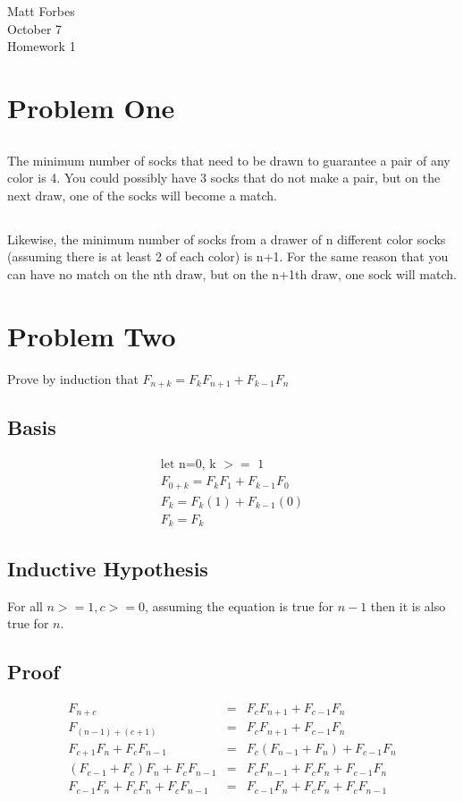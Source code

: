 \documentclass[a4paper,12pt]{article}
\begin{document}
\noindent Matt Forbes \\
October 7 \\
Homework 1 \\


\section{Problem One}
\subsection{}
The minimum number of socks that need to be drawn to guarantee a pair
of any color is 4.  You could possibly have 3 socks that do not make a
pair, but on the next draw, one of the socks will become a match.
\subsection{}
Likewise, the minimum number of socks from a drawer of n different
color socks (assuming there is at least 2 of each color) is n+1. For
the same reason that you can have no match on the nth draw, but on the
n+1th draw, one sock will match.

\section{Problem Two}
Prove by induction that \(F_{n+k} = F_kF_{n+1} + F_{k-1}F_n\)
\subsection{Basis}
\begin{align*}
  \text{let n=0, k \(>=\) 1} \\
  F_{0+k} = F_kF_1 + F_{k-1}F_0 \\
  F_k = F_k(1) + F_{k-1}(0) \\
  F_k = F_k
\end{align*}

\subsection{Inductive Hypothesis}
For all \(n >= 1, c >= 0 \), assuming the equation is true for \(n-1\) then it 
is also true for \(n\).

\subsection{Proof}
\begin{eqnarray*}
  F_{n+c} &=& F_cF_{n+1} + F_{c-1}F_n \\
  F_{(n-1) + (c+1)} &=& F_cF_{n+1} + F_{c-1}F_n \\
  F_{c+1}F_n + F_cF_{n-1} &=& F_c(F_{n-1} + F_n) + F_{c-1}F_n \\
  (F_{c-1} + F_c)F_n + F_cF_{n-1} &=& F_cF_{n-1} + F_cF_n + F_{c-1}F_n \\
  F_{c-1}F_n + F_cF_n + F_cF_{n-1} &=& F_{c-1}F_n + F_cF_n + F_cF_{n-1} \\
\end{eqnarray*}
\end{document}
